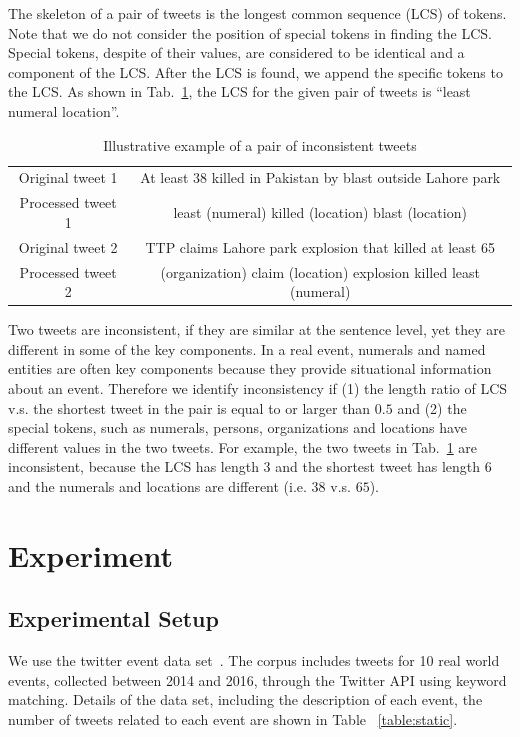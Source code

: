 \documentclass[envcountsame]{llncs}
\begin{document}
The skeleton of a pair of tweets is the longest common sequence (LCS) of tokens. Note that we do not consider the position of special tokens in finding the LCS. Special tokens, despite of their values, are considered to be identical and a component of the LCS. After the LCS is found, we append the specific tokens to the LCS. As shown in Tab.~\ref{tab:example}, the LCS for the given pair of tweets is ``least numeral location''.
 
\begin{table}\label{tab:example}
\caption{Illustrative example of a pair of inconsistent tweets}
\begin{tabular}{|c|c|}
\hline
Original tweet 1 & At least 38 killed in Pakistan by blast outside Lahore park \\
Processed tweet 1  & least (numeral) killed  (location) blast  (location)\\\hline
Original tweet 2 &    TTP claims Lahore park explosion that killed at least 65 \\
Processed tweet 2& (organization) claim (location) explosion killed least (numeral)\\\hline
\end{tabular}    
\end{table}

Two tweets are inconsistent, if they are similar at the sentence level, yet they are different in some of the key components. In a real event, numerals and named entities are often key components because they provide situational information about an event. Therefore we identify inconsistency if (1) the length ratio of LCS v.s. the shortest tweet in the pair is equal to or larger than $0.5$ and (2) the special tokens, such as numerals, persons, organizations and locations have different values in the two tweets. For example, the two tweets in Tab.~\ref{tab:example} are inconsistent, because the LCS has length $3$ and the shortest tweet has length $6$ and the numerals and locations are different (i.e. $38$ v.s. $65$). 


\section{Experiment}\label{sec:experiment}
\subsection{Experimental Setup}
We use the twitter event data set~\cite{ZubiagaTwitterDatasets}. The corpus includes tweets for 10 real world events, collected between 2014 and 2016, through the Twitter API using keyword matching. Details of the data set, including the description of each event, the number of tweets related to each event are shown in Table ~\ref{table:static}.
\end{document}
